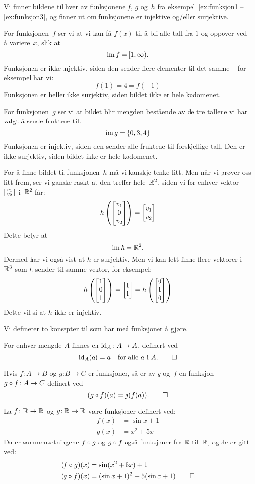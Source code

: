 \begin{ex}
Vi finner bildene til hver av funksjonene $f$, $g$ og~$h$ fra
eksempel~\ref{ex:funksjon1}--\ref{ex:funksjon3}, og finner ut om
funksjonene er injektive og/eller surjektive.

For funksjonen~$f$ ser vi at vi kan få $f(x)$ til å bli alle tall fra
$1$ og oppover ved å variere~$x$, slik at
\[
\operatorname{im} f = [ 1, \infty ).
\]
Funksjonen er ikke injektiv, siden den sender flere elementer til det
samme -- for eksempel har vi:
\[
f(1) = 4 = f(-1)
\]
Funksjonen er heller ikke surjektiv, siden bildet ikke er hele
kodomenet.

For funksjonen~$g$ ser vi at bildet blir mengden bestående av de tre
tallene vi har valgt å sende fruktene til:
\[
\operatorname{im} g = \{ 0, 3, 4 \}
\]
Funksjonen er injektiv, siden den sender alle fruktene til
forskjellige tall.  Den er ikke surjektiv, siden bildet ikke er hele
kodomenet.

For å finne bildet til funksjonen~$h$ må vi kanskje tenke litt.  Men
når vi prøver oss litt frem, ser vi ganske raskt at den treffer
hele~$\mathbb{R}^2$, siden vi for enhver vektor $\left[ \begin{smallmatrix} v_1 \\ v_2 \end{smallmatrix} \right]$ i~$\mathbb{R}^2$ får:
\[
h\left( \begin{bmatrix} v_1 \\ 0 \\ v_2 \end{bmatrix} \right) = \begin{bmatrix} v_1 \\ v_2 \end{bmatrix}
\]
Dette betyr at
\[
\operatorname{im} h = \mathbb{R}^2.
\]
Dermed har vi også vist at $h$ er surjektiv.  Men vi kan lett finne
flere vektorer i~$\mathbb{R}^3$ som $h$ sender til samme vektor, for eksempel:
\[
h\left(\begin{bmatrix} 1 \\ 0 \\ 1 \end{bmatrix}\right) = \begin{bmatrix} 1 \\ 1 \end{bmatrix} = h\left(\begin{bmatrix} 0 \\ 1 \\ 0 \end{bmatrix}\right)
\]
Dette vil si at $h$ ikke er injektiv.
\end{ex}

Vi definerer to konsepter til som har med funksjoner å gjøre.

\begin{defn}
For enhver mengde~$A$ finnes en 
$\operatorname{id}_A \colon A \to A$, definert ved
\[
\operatorname{id}_A(a) = a \quad\text{for alle $a$ i~$A$.}
\qedhere
\]
\end{defn}

\begin{defn}
Hvis $f \colon A \to B$ og $g \colon B \to C$ er funksjoner, så er
 av $g$ og~$f$ en funksjon
$g \circ f \colon A \to C$ definert ved
\[
(g \circ f)(a) = g(f(a)).
\qedhere
\]
\end{defn}

\begin{ex}
La $f \colon \mathbb{R} \to \mathbb{R}$ og $g \colon \mathbb{R} \to \mathbb{R}$ være funksjoner
definert ved:
\begin{align*}
f(x) &= \sin x + 1 \\
g(x) &= x^2 + 5x
\end{align*}
Da er sammensetningene $f \circ g$ og $g \circ f$ også funksjoner
fra $\mathbb{R}$ til~$\mathbb{R}$, og de er gitt ved:
\begin{align*}
(f \circ g)(x) &= \sin (x^2 + 5x) + 1 \\
(g \circ f)(x) &= (\sin x + 1)^2 + 5(\sin x + 1)\qedhere
\end{align*}
\end{ex}

